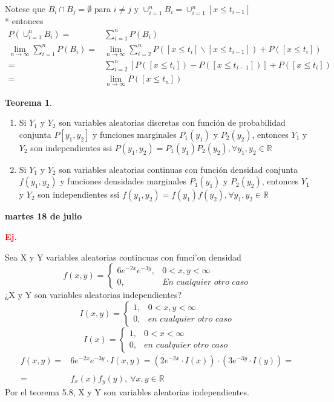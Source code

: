 \documentclass[12pt,letterpaper]{article}
\theoremstyle{definition}
\newtheorem{theorem}{Teorema}[section]
\begin{document}
Notese que $B_i\cap B_j=\emptyset$ para $i\neq j$ y $\cup^n_{i=1}B_i=\cup^n_{i=1}[x\leq t_{i-1}]$\\*
entonces 
\[
\begin{array}{rl}
	P\left(\cup^{n}_{i=1}B_i\right)=&\sum^{n}_{i=1}P(B_i)\\
	\lim\limits_{n\to \infty} \sum^{n}_{i=1}P(B_i)=& \lim\limits_{n\to \infty}\sum^{n}_{i=2}P([x\leq t_i]\smallsetminus [x\leq t_{i-1}])+P([x\leq t_i])\\
	=& \sum^{n}_{i=2}\left[P([x\leq t_i])-P([x\leq t_{i-1}])\right]+P([x\leq t_i])\\
	=& \lim\limits_{n\to \infty} P([x\leq t_n])
\end{array}
\]

\begin{theorem}
\hfill
	\begin{enumerate}
		\item Si $Y_1$ y $Y_2$ son variables aleatorias discretas con función de probabilidad conjunta $P[y_1,y_2]$ y funciones marginales $P_1(y_1)$ y $P_2(y_2)$, entonces $Y_1$ y $Y_2$ son independientes ssi $P(y_1,y_2)=P_1(y_1)P_2(y_2),\forall y_1,y_2\in \mathbb{R}$
		\item Si $Y_1$ y $Y_2$ son variables aleatorias continuas con función densidad conjunta $f(y_1,y_2)$ y funciones densidades marginales $P_1(y_1)$ y $P_2(y_2)$, entonces $Y_1$ y $Y_2$ son independientes ssi $f(y_1,y_2)=f(y_1)f(y_2),\forall y_1,y_2\in \mathbb{R}$
	\end{enumerate}
\end{theorem}
\newpage
\textbf{martes 18 de julio}

\textbf{\textcolor{red}{Ej.}}

Sea X y Y variables aleatorias contincuas con funci'on densidad 
\[
f(x,y)=
\begin{cases}
	6e^{-2x}e^{-3y},& 0<x,y<\infty \\
	0,& \mathrm{\textit{En cualquier otro caso}}
\end{cases}\]
¿X y Y son variables aleatorias independientes?
\[I(x,y)=\left\{
\begin{array}{rl}
	1,& 0<x,y<\infty\\
	0, & \textit{en cualquier otro caso}
\end{array}\right.\]
\[I(x)=\left\{
\begin{array}{rl}
	1,& 0<x<\infty\\
	0, & \textit{en cualquier otro caso}
\end{array}\right.\]
\[
\begin{array}{rl}
	f(x,y)=&6e^{-2x}e^{-3y}\cdot I(x,y)=(2e^{-2x}\cdot I(x))\cdot (3e^{-3y}\cdot I(y))=\\
	\\
	=&f_x(x)f_y(y),\ \forall x,y\in \mathbb{R}
\end{array}
\]
Por el teorema 5.8, X y Y son variables aleatorias independientes.
\end{document}
